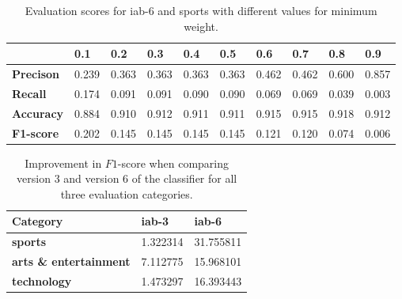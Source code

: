 \begin{table}[h]
\centering
\renewcommand{\arraystretch}{1.25}
\begin{tabularx}{\textwidth}{l |X|X|X|X|X|X|X|X|X}
               & {\bf 0.1} & {\bf 0.2} & {\bf 0.3} & {\bf 0.4} & {\bf 0.5} & {\bf 0.6} & {\bf 0.7} & {\bf 0.8} & {\bf 0.9} \\ \hline
{\bf Precison} & 0.239     & 0.363     & 0.363     & 0.363     & 0.363     & 0.462     & 0.462     & 0.600     & 0.857     \\ \hline
{\bf Recall}   & 0.174     & 0.091     & 0.091     & 0.090     & 0.090     & 0.069     & 0.069     & 0.039     & 0.003     \\ \hline
{\bf Accuracy} & 0.884     & 0.910     & 0.912     & 0.911     & 0.911     & 0.915     & 0.915     & 0.918     & 0.912     \\ \hline
{\bf F1-score} & 0.202     & 0.145     & 0.145     & 0.145     & 0.145     & 0.121     & 0.120     & 0.074     & 0.006     
\end{tabularx}
\caption[Evaluation scores for different minimum weights.]{Evaluation scores for iab-6 and sports with different values for minimum weight.}
\label{tab:classification_evaluation_weights}
\end{table}


\begin{table}[h]
\centering
\renewcommand{\arraystretch}{1.25}
\begin{tabular}{l|l|l}
\textbf{Category}               & \textbf{iab-3}    & \textbf{iab-6}    \\ \hline
\textbf{sports}                 & 1.322314          & 31.755811         \\ \hline
\textbf{arts \& entertainment}  & 7.112775          & 15.968101         \\ \hline
\textbf{technology}             & 1.473297          & 16.393443
\end{tabular}
\caption[Improvement in $F_{1}$-score in newer classifier versions]{Improvement in $F{1}$-score when comparing version 3 and version 6 of the classifier for all three evaluation categories.}
\label{tab:improved_f1}
\end{table}
